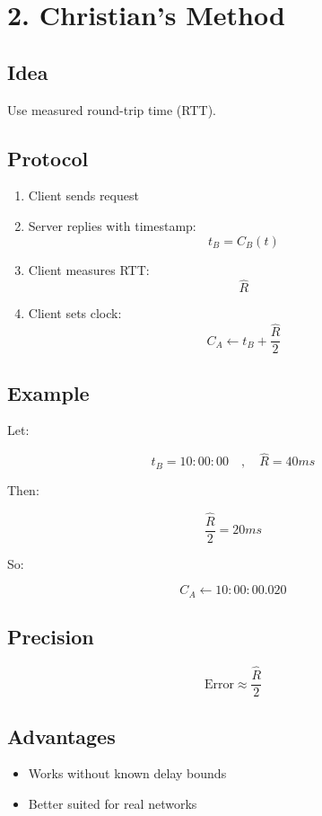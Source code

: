 \section{2. Christian's Method}

\subsection{Idea}

Use measured round-trip time (RTT).

\subsection{Protocol}

\begin{enumerate}
    \item Client sends request
    \item Server replies with timestamp:
    \[
    t_B = C_B(t)
    \]
    \item Client measures RTT:
    \[
    \hat{R}
    \]
    \item Client sets clock:
    \[
    C_A \leftarrow t_B + \frac{\hat{R}}{2}
    \]
\end{enumerate}

\subsection{Example}

Let:

\[
t_B = 10:00:00
\quad,\quad
\hat{R} = 40ms
\]

Then:

\[
\frac{\hat{R}}{2} = 20ms
\]

So:

\[
C_A \leftarrow 10:00:00.020
\]

\subsection{Precision}

\[
\text{Error} \approx \frac{\hat{R}}{2}
\]

\subsection{Advantages}

\begin{itemize}
    \item Works without known delay bounds
    \item Better suited for real networks
\end{itemize}

